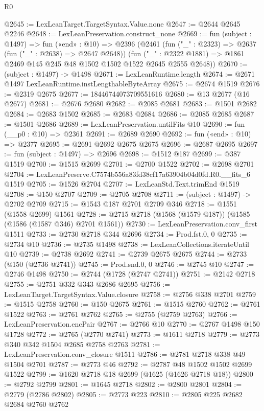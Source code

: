 \begin{lexlean}{R0}
\begin{coremodule}
@2645 := LexLeanTarget.TargetSyntax.Value.none
@2647 := @2644 @2645 @2246
@2648 := LexLeanPreservation.construct_none
@2669 := fun (subject : @1497) =>
  fun («end» : @10) =>
  @2396
    (@2461
      (fun ("_" : @2323) => @2637 (fun ("_" : @2638) => @2647 @2648))
      (fun ("_" : @2322 @1881) => @1861 @2469 @145 @245 @48 @1502 @1502 @1522 @2645 @2555 @2648))
@2670 := (subject : @1497) -> @1498
@2671 := LexLeanRuntime.length
@2674 := @2671 @1497 LexLeanRuntime.instLengthableByteArray
@2675 := @2674 @1519
@2676 := @2319 @2675
@2677 := 18446744073709551616
@2680 := @13 @2677 (@16 @2677)
@2681 := @2676 @2680
@2682 := @2085 @2681
@2683 := @1501 @2682
@2684 := @2683 @1502
@2685 := @2683 @2684
@2686 := @2085 @2685
@2687 := @1501 @2686
@2689 := LexLeanPreservation.untilFits @10
@2690 := fun (__p0 : @10) => @2361
@2691 := @2689 @2690
@2692 := fun («end» : @10) => @2377
@2695 := @2691 @2692 @2675 @2675
@2696 := @2687 @2695
@2697 := fun (subject : @1497) => @2696
@2698 := @1512 @187
@2699 := @387 @1519
@2700 := @1515 @2699
@2701 := @2700 @1522
@2702 := @2698 @2701
@2704 := LexLeanPreserve.C7574b556a83fd38cf17a63904b04d0fd.R0.__fits_6 @1519
@2705 := @1526 @2704
@2707 := LexLeanStd.Text.trimEnd @1519
@2708 := @150 @2707
@2709 := @2705 @2708
@2711 := (subject : @1497) -> @2702 @2709
@2715 := @1543 @187 @2701 @2709 @346
@2718 := @1551 (@1558 @2699) @1561
@2728 := @2715 @2718 (@1568 (@1579 @187)) (@1585 (@1586 (@1587 @346) @2701 @1561))
@2730 := LexLeanPreservation.conv_first @1511
@2733 := @2730 @2718 @344 @2696
@2734 := Prod.fst.{0, 0}
@2735 := @2734 @10
@2736 := @2735 @1498
@2738 := LexLeanCollections.iterateUntil @10
@2739 := @2738 @2692
@2741 := @2739 @2675 @2675
@2744 := @2733 (@150 (@2736 @2741))
@2745 := Prod.snd.{0, 0}
@2746 := @2745 @10
@2747 := @2746 @1498
@2750 := @2744 (@1728 (@2747 @2741))
@2751 := @2142 @2718
@2755 := @2751 @332 @343 @2686 @2695
@2756 := LexLeanTarget.TargetSyntax.Value.closure
@2758 := @2756 @338 @2701
@2759 := @1515 @2758
@2760 := @150 @2675
@2761 := @1515 @2760
@2762 := @2761 @1522
@2763 := @2761 @2762
@2765 := @2755 (@2759 @2763)
@2766 := LexLeanPreservation.encPair
@2767 := @2766 @10
@2770 := @2767 @1498 @150 @1728
@2772 := @2765 (@2770 @2741)
@2773 := @1611 @2718
@2779 := @2773 @340 @342 @1504 @2685 @2758 @2763
@2781 := LexLeanPreservation.conv_closure @1511
@2786 := @2781 @2718 @338 @49 @1504 @2701
@2787 := @2773 @46
@2792 := @2787 @48 @1502 @1502 @2699 @1522
@2799 := @1620 @2718 @18 @2699 (@1625 (@1626 @2718 @18))
@2800 := @2792 @2799
@2801 := @1645 @2718
@2802 := @2800 @2801
@2804 := @2779 (@2786 @2802)
@2805 := @2773 @223
@2810 := @2805 @225 @2682 @2684 @2760 @2762

\end{coremodule}
\end{lexlean}
